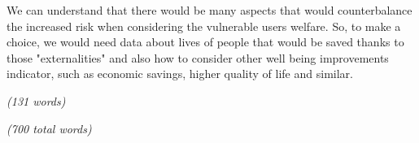 We can understand that there would be many aspects that would counterbalance the increased risk when considering the vulnerable users welfare. So, to make a choice, we would need data about lives of people that would be saved thanks to those "externalities" and also how to consider other well being improvements indicator, such as economic savings, higher quality of life and similar.

\emph{(131 words)}

\emph{(700 total words)}

